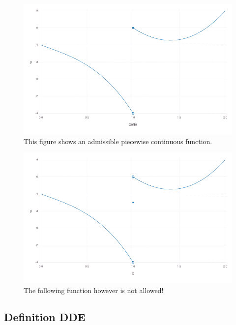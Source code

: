 \documentclass[10pt]{article}
\begin{document}
\begin{figure}[h]\centering
	\includegraphics[width=\textwidth]{allowed.png}
	\caption{This figure shows an admissible piecewise continuous function.}
	\label{fig:allowed}
\end{figure}


\begin{figure}[h]\centering
    \includegraphics[width=\textwidth]{not-allowed.png}
	\caption{The following function however is not allowed!}
	\label{fig:not-allowed}
\end{figure}

\subsection{Definition DDE}\label{definition-dde}
\end{document}
